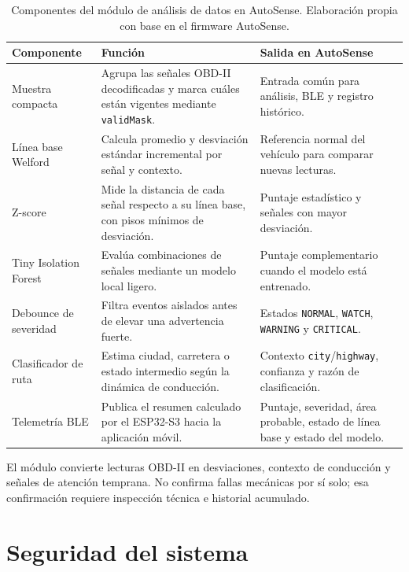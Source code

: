 \documentclass[12pt,letterpaper]{report}
\begin{document}
\begin{table}[htbp]
\centering
\small
\caption{Componentes del módulo de análisis de datos en AutoSense. Elaboración propia con base en el firmware AutoSense.}
\label{tab:data-analysis-module}
\begin{tabular}{p{}p{}p{}}
\toprule
\textbf{Componente} & \textbf{Función} & \textbf{Salida en AutoSense} \\
\midrule
Muestra compacta & Agrupa las señales OBD-II decodificadas y marca cuáles están vigentes mediante \texttt{validMask}. & Entrada común para análisis, BLE y registro histórico. \\
\addlinespace
Línea base Welford & Calcula promedio y desviación estándar incremental por señal y contexto. & Referencia normal del vehículo para comparar nuevas lecturas. \\
\addlinespace
Z-score & Mide la distancia de cada señal respecto a su línea base, con pisos mínimos de desviación. & Puntaje estadístico y señales con mayor desviación. \\
\addlinespace
Tiny Isolation Forest & Evalúa combinaciones de señales mediante un modelo local ligero. & Puntaje complementario cuando el modelo está entrenado. \\
\addlinespace
Debounce de severidad & Filtra eventos aislados antes de elevar una advertencia fuerte. & Estados \texttt{NORMAL}, \texttt{WATCH}, \texttt{WARNING} y \texttt{CRITICAL}. \\
\addlinespace
Clasificador de ruta & Estima ciudad, carretera o estado intermedio según la dinámica de conducción. & Contexto \texttt{city}/\texttt{highway}, confianza y razón de clasificación. \\
\addlinespace
Telemetría BLE & Publica el resumen calculado por el ESP32-S3 hacia la aplicación móvil. & Puntaje, severidad, área probable, estado de línea base y estado del modelo. \\
\bottomrule
\end{tabular}
\end{table}

El módulo convierte lecturas OBD-II en desviaciones, contexto de conducción y señales de atención temprana. No confirma fallas mecánicas por sí solo; esa confirmación requiere inspección técnica e historial acumulado.

\section{Seguridad del sistema}
\end{document}
